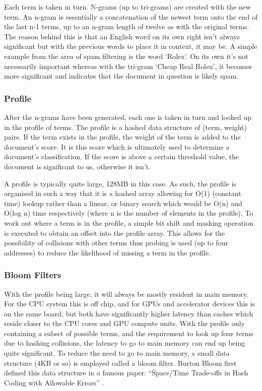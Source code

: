 Each term is taken in turn. N-grams (up to tri-grams) are created with the new
term. An n-gram is essentially a concatenation of the newest term onto the end
of the last n-1 terms, up to an n-gram length of twelve as with the original
terms. The reason behind this is that an English word on its own right isn't
always significant but with the previous words to place it in context, it may
be. A simple example from the area of spam filtering is the word `Rolex'. On its
own it's not necessarily important whereas with the tri-gram `Cheap Real Rolex',
it becomes more significant and indicates that the document in question is
likely spam.

\subsubsection{Profile}

After the n-grams have been generated, each one is taken in turn and looked up
in the profile of terms. The profile is a hashed data structure of (term,
weight) pairs. If the term exists in the profile, the weight of the term is
added to the document's score. It is this score which is ultimately used to
determine a document's classification. If the score is above a certain threshold
value, the document is significant to us, otherwise it isn't.

A profile is typically quite large, 128MB in this case. As such, the profile is
organised in such a way that it is a hashed array allowing for O(1) (constant
time) lookup rather than a linear, or binary search which would be O(n) and
O(log n) time respectively (where n is the number of elements in the profile).
To work out where a term is in the profile, a simple bit shift and masking
operation is executed to obtain an offset into the profile array. This allows
for the possibility of collisions with other terms thus probing is used (up to
four addresses) to reduce the likelihood of missing a term in the profile.

\subsubsection{Bloom Filters}

With the profile being large, it will always be mostly resident in main memory.
For the CPU system this is off chip, and for GPUs and accelerator devices this
is on the same board, but both have significantly higher latency than caches
which reside closer to the CPU cores and GPU compute units. With the profile
only containing a subset of possible terms, and the requirement to look up four
terms due to hashing collisions, the latency to go to main memory can end up
being quite significant. To reduce the need to go to main memory, a small data
structure (4KB or so) is employed called a bloom filter. Burton Bloom first
defined this data structure in a famous paper: ``Space/Time Trade-offs in Hash
Coding with Allowable Errors'' \cite{bloom1970space}.

